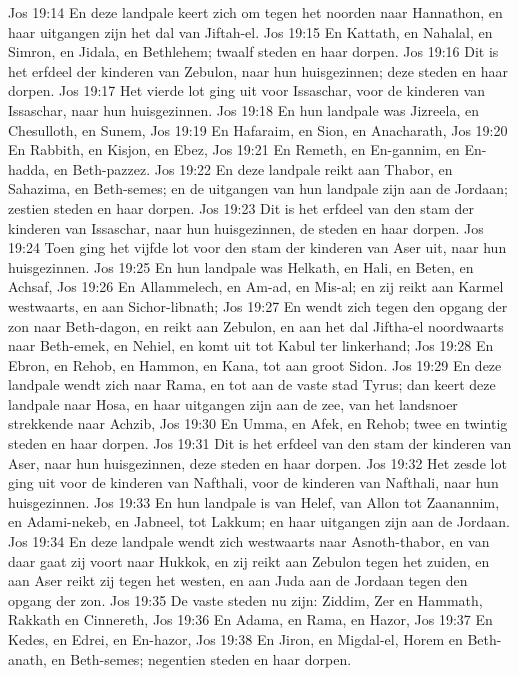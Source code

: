 Jos 19:14  En deze landpale keert zich om tegen het noorden naar Hannathon, en haar uitgangen zijn het dal van Jiftah-el.
Jos 19:15  En Kattath, en Nahalal, en Simron, en Jidala, en Bethlehem; twaalf steden en haar dorpen.
Jos 19:16  Dit is het erfdeel der kinderen van Zebulon, naar hun huisgezinnen; deze steden en haar dorpen.
Jos 19:17  Het vierde lot ging uit voor Issaschar, voor de kinderen van Issaschar, naar hun huisgezinnen.
Jos 19:18  En hun landpale was Jizreela, en Chesulloth, en Sunem,
Jos 19:19  En Hafaraim, en Sion, en Anacharath,
Jos 19:20  En Rabbith, en Kisjon, en Ebez,
Jos 19:21  En Remeth, en En-gannim, en En-hadda, en Beth-pazzez.
Jos 19:22  En deze landpale reikt aan Thabor, en Sahazima, en Beth-semes; en de uitgangen van hun landpale zijn aan de Jordaan; zestien steden en haar dorpen.
Jos 19:23  Dit is het erfdeel van den stam der kinderen van Issaschar, naar hun huisgezinnen, de steden en haar dorpen.
Jos 19:24  Toen ging het vijfde lot voor den stam der kinderen van Aser uit, naar hun huisgezinnen.
Jos 19:25  En hun landpale was Helkath, en Hali, en Beten, en Achsaf,
Jos 19:26  En Allammelech, en Am-ad, en Mis-al; en zij reikt aan Karmel westwaarts, en aan Sichor-libnath;
Jos 19:27  En wendt zich tegen den opgang der zon naar Beth-dagon, en reikt aan Zebulon, en aan het dal Jiftha-el noordwaarts naar Beth-emek, en Nehiel, en komt uit tot Kabul ter linkerhand;
Jos 19:28  En Ebron, en Rehob, en Hammon, en Kana, tot aan groot Sidon.
Jos 19:29  En deze landpale wendt zich naar Rama, en tot aan de vaste stad Tyrus; dan keert deze landpale naar Hosa, en haar uitgangen zijn aan de zee, van het landsnoer strekkende naar Achzib,
Jos 19:30  En Umma, en Afek, en Rehob; twee en twintig steden en haar dorpen.
Jos 19:31  Dit is het erfdeel van den stam der kinderen van Aser, naar hun huisgezinnen, deze steden en haar dorpen.
Jos 19:32  Het zesde lot ging uit voor de kinderen van Nafthali, voor de kinderen van Nafthali, naar hun huisgezinnen.
Jos 19:33  En hun landpale is van Helef, van Allon tot Zaanannim, en Adami-nekeb, en Jabneel, tot Lakkum; en haar uitgangen zijn aan de Jordaan.
Jos 19:34  En deze landpale wendt zich westwaarts naar Asnoth-thabor, en van daar gaat zij voort naar Hukkok, en zij reikt aan Zebulon tegen het zuiden, en aan Aser reikt zij tegen het westen, en aan Juda aan de Jordaan tegen den opgang der zon.
Jos 19:35  De vaste steden nu zijn: Ziddim, Zer en Hammath, Rakkath en Cinnereth,
Jos 19:36  En Adama, en Rama, en Hazor,
Jos 19:37  En Kedes, en Edrei, en En-hazor,
Jos 19:38  En Jiron, en Migdal-el, Horem en Beth-anath, en Beth-semes; negentien steden en haar dorpen.
